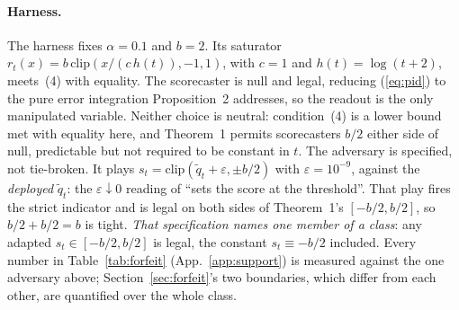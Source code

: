 \paragraph{Harness.} The harness fixes $\alpha = 0.1$ and $b = 2$. Its saturator $r_t(x) =
b\,\mathrm{clip}(x/(c\,h(t)),-1,1)$, with $c = 1$ and $h(t) = \log(t+2)$, meets~(4) with equality.
The scorecaster is null and legal, reducing (\ref{eq:pid}) to the pure error integration
Proposition~2 addresses, so the readout is the only manipulated variable. Neither choice is
neutral: condition~(4) is a lower bound met with equality here, and Theorem~1 permits scorecasters $b/2$ either
side of null, predictable but not required to be constant in $t$. The adversary is specified, not
tie-broken. It plays $s_t = \mathrm{clip}(\tilde{q}_t+\varepsilon,\pm b/2)$ with $\varepsilon =
10^{-9}$, against the \emph{deployed} $\tilde{q}_t$: the $\varepsilon\downarrow 0$ reading of
``sets the score at the threshold''. That play fires the strict indicator and is legal on both
sides of Theorem~1's $[-b/2,b/2]$, so $b/2+b/2 = b$ is tight. \emph{That specification names one
member of a class}: any adapted $s_t \in [-b/2,b/2]$ is legal, the constant $s_t \equiv -b/2$
included. Every number in Table~\ref{tab:forfeit} (App.~\ref{app:support}) is measured against the
one adversary above;
Section~\ref{sec:forfeit}'s two boundaries, which differ from each other, are quantified over the
whole class.
